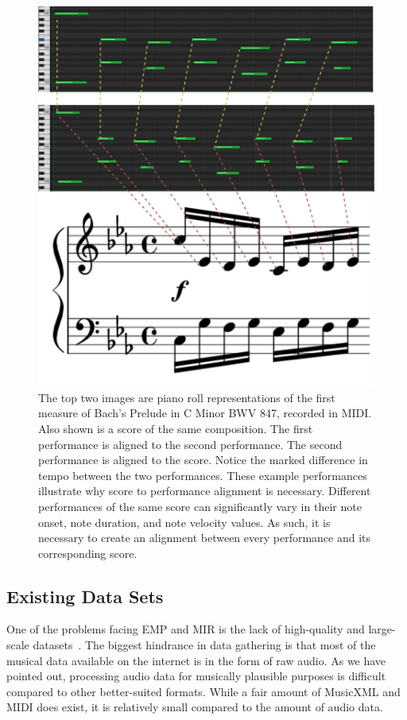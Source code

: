 \begin{figure}
    \centering
    \includegraphics[width=0.8\linewidth]{figs/ch2/score_2_perf_alignment.jpg}
    \caption{The top two images are piano roll representations of the first measure of Bach's Prelude in C Minor BWV 847, recorded in MIDI. Also shown is a score of the same composition. The first performance is aligned to the second performance. The second performance is aligned to the score. Notice the marked difference in tempo between the two performances. These example performances illustrate why score to performance alignment is necessary. Different performances of the same score can significantly vary in their note onset, note duration, and note velocity values. As such, it is necessary to create an alignment between every performance and its corresponding score.}
    \label{fig:alignment}
\end{figure}

\subsection{Existing Data Sets}
One of the problems facing EMP and MIR is the lack of high-quality and large-scale datasets~\cite{cancino2018computational}. The biggest hindrance in data gathering is that most of the musical data available on the internet is in the form of raw audio. As we have pointed out, processing audio data for musically plausible purposes is difficult compared to other better-suited formats. While a fair amount of MusicXML and MIDI does exist, it is relatively small compared to the amount of audio data. 

